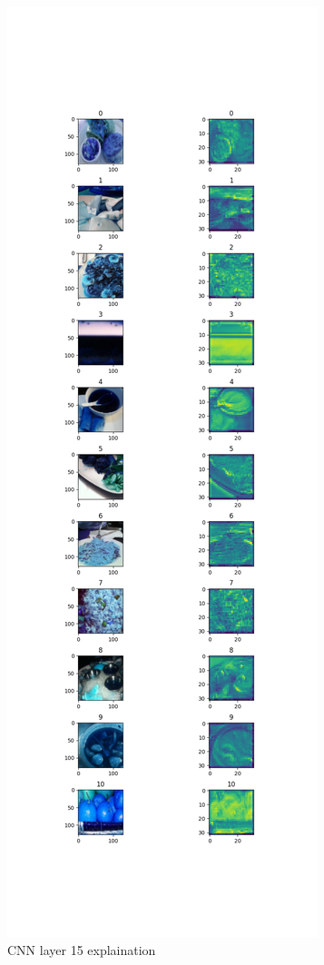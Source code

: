 \documentclass[a4paper,11pt]{article}
\begin{document}
\begin{enumerate}
		\begin{figure}[htp]
		    \begin{center}
		    		\includegraphics[scale=0.3]{./filter_layer_15_explaination_results.png}
		    	\caption{CNN layer 15 explaination}
		    \end{center}
		\end{figure}


\end{enumerate}
\end{document}
